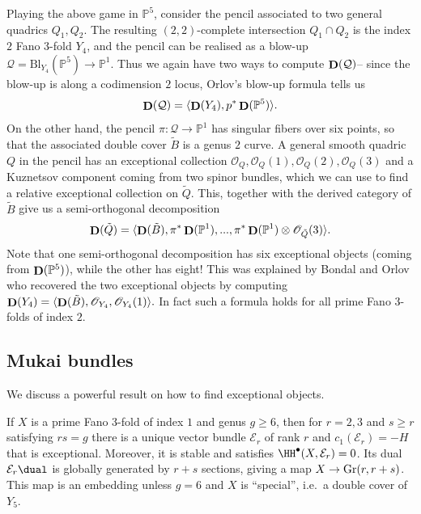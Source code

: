 \begin{example}
    Playing the above game in \(\mathbb{P}^5\), consider the pencil associated
    to two general quadrics \(Q_1,Q_2\). The resulting \((2,2)\)-complete
    intersection \(Q_1\cap Q_2\) is the index \(2\) Fano 3-fold \(Y_4\), and
    the pencil can be realised as a blow-up
    \(\mathcal{Q}=\text{Bl}_{Y_4}(\mathbb{P}^5)\to \mathbb{P}^1\). Thus we again
    have two ways to compute \(\mathop{\mathbf{D}}(\mathcal{Q})\)-- since the blow-up is along
    a codimension \(2\) locus, Orlov's blow-up formula tells us
    \[\mathop{\mathbf{D}}(\mathcal{Q})=\langle \mathop{\mathbf{D}}(Y_4), p^\ast \mathop{\mathbf{D}}(\mathbb{P}^5)\rangle.\]
    On the other hand, the pencil \(\pi:\mathcal{Q}\to \mathbb{P}^1\)
    has singular fibers over six points, so that the
    associated double cover \(\tilde B\) is a genus \(2\)
    curve. A general smooth quadric \(Q\) in the pencil has an exceptional
    collection \(\mathscr{O}_Q, \mathscr{O}_Q(1),\mathscr{O}_Q(2),
    \mathscr{O}_Q(3)\) and a Kuznetsov component coming from two spinor bundles,
    which we can use to find a relative exceptional collection on \(\tilde{Q}\).
    This, together with the derived category of \(\tilde{B}\) give us a
    semi-orthogonal decomposition
    \[
        \mathop{\mathbf{D}}(\tilde Q) = \langle \mathop{\mathbf{D}}(\tilde B) , \pi^\ast \mathop{\mathbf{D}}(\mathbb{P}^1),
        ..., \pi^\ast \mathop{\mathbf{D}}(\mathbb{P}^1)\otimes \mathscr{O}_{\tilde
        Q}(3)\rangle.
    \]
    Note that one semi-orthogonal decomposition has six exceptional objects
    (coming from \(\mathop{\mathbf{D}}(\mathbb{P}^5)\)), while the other has eight! This was
    explained by Bondal and Orlov who recovered the two exceptional objects by
    computing \(\mathop{\mathbf{D}}(Y_4)=\langle \mathop{\mathbf{D}}(\tilde B), \mathscr{O}_{Y_4},
    \mathscr{O}_{Y_4}(1) \rangle.\) In fact such a formula holds for all prime
    Fano 3-folds of index \(2\).
\end{example}

\subsection{Mukai bundles} We discuss a powerful result on how to find
exceptional objects.

\begin{theorem}[(Mukai)]
    If \(X\) is a prime Fano 3-fold of index \(1\) and genus \(g\geq 6\), then
    for \(r=2,3\) and \(s\geq r\) satisfying \(rs=g\) there is a unique vector
    bundle \(\mathcal{E}_r\) of rank \(r\) and \(c_1(\mathcal{E}_r)=-H\) that is
    exceptional. Moreover, it is stable and satisfies
    \(\HH^\bullet (X,\mathcal{E}_r)=0\). Its dual \(\mathcal{E}_r\dual\) is
    globally generated by \(r+s\) sections, giving a map \(X\to
    \textnormal{Gr}(r,r+s)\). This map is an embedding unless \(g=6\) and \(X\)
    is ``special'', i.e.\ a double cover of \(Y_5\).
\end{theorem}

